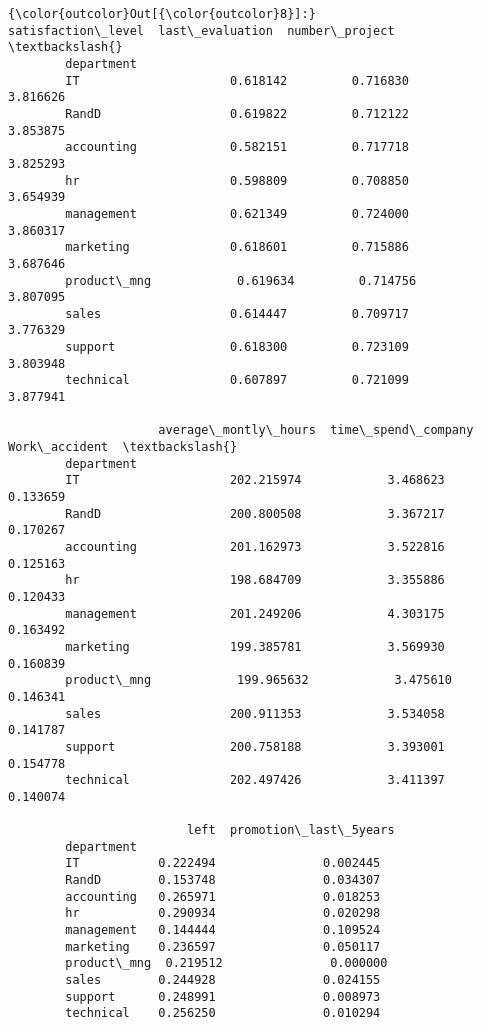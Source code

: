 \documentclass[11pt]{article}
\begin{document}
\begin{Verbatim}[commandchars=\\\{\}]
{\color{outcolor}Out[{\color{outcolor}8}]:}              satisfaction\_level  last\_evaluation  number\_project  \textbackslash{}
        department                                                         
        IT                     0.618142         0.716830        3.816626   
        RandD                  0.619822         0.712122        3.853875   
        accounting             0.582151         0.717718        3.825293   
        hr                     0.598809         0.708850        3.654939   
        management             0.621349         0.724000        3.860317   
        marketing              0.618601         0.715886        3.687646   
        product\_mng            0.619634         0.714756        3.807095   
        sales                  0.614447         0.709717        3.776329   
        support                0.618300         0.723109        3.803948   
        technical              0.607897         0.721099        3.877941   
        
                     average\_montly\_hours  time\_spend\_company  Work\_accident  \textbackslash{}
        department                                                             
        IT                     202.215974            3.468623       0.133659   
        RandD                  200.800508            3.367217       0.170267   
        accounting             201.162973            3.522816       0.125163   
        hr                     198.684709            3.355886       0.120433   
        management             201.249206            4.303175       0.163492   
        marketing              199.385781            3.569930       0.160839   
        product\_mng            199.965632            3.475610       0.146341   
        sales                  200.911353            3.534058       0.141787   
        support                200.758188            3.393001       0.154778   
        technical              202.497426            3.411397       0.140074   
        
                         left  promotion\_last\_5years  
        department                                    
        IT           0.222494               0.002445  
        RandD        0.153748               0.034307  
        accounting   0.265971               0.018253  
        hr           0.290934               0.020298  
        management   0.144444               0.109524  
        marketing    0.236597               0.050117  
        product\_mng  0.219512               0.000000  
        sales        0.244928               0.024155  
        support      0.248991               0.008973  
        technical    0.256250               0.010294  
\end{Verbatim}
            
\end{document}
